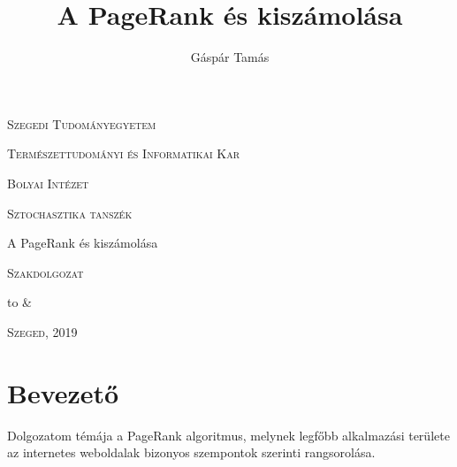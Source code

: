 \documentclass[12pt,a4paper]{article}
\author{Gáspár Tamás}
\title{A PageRank és kiszámolása}
\date{}
\begin{document}

\thispagestyle{empty}
\centerline{\textsc{\Large{Szegedi Tudományegyetem}}}
\vspace{0.3 cm}
\centerline{\textsc{\Large{Természettudományi és Informatikai Kar}}}

\vspace*{2 cm}

\centerline{\textsc{\Large{Bolyai Intézet}}}
\vspace{0.3 cm}
\centerline{\textsc{\Large{Sztochasztika tanszék}}}

\vspace{3 cm}

\centerline{\LARGE{A PageRank és kiszámolása}}
\vspace{0.5 cm}
\centerline{\Large{\textsc{Szakdolgozat}}}

\vspace{3 cm}

\begin{center}
	\begin{tabu} to \textwidth { X[l]  X[r] }
		 &
		  \\
	\end{tabu}
\end{center}

\vspace{3 cm}

\centerline{\Large{\textsc{Szeged, 2019}}}

\newpage
\thispagestyle{empty}

\tableofcontents

\newpage
\setcounter{page}{1}
\fontsize{12}{16}\selectfont

\section{Bevezető}

Dolgozatom témája a PageRank algoritmus, melynek legfőbb alkalmazási területe az internetes weboldalak bizonyos szempontok szerinti rangsorolása.
\end{document}
